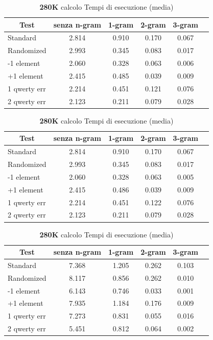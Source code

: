 \documentclass{article}
\begin{document}
\begin{table}[htbp]
\centering 
\caption{\textbf{9K} calcolo Tempi di esecuzione (media)}
\begin{tabular}{l c c c c c}
\hline\hline
\multicolumn{1}{c}{\textbf{Test}}& \textbf{senza n-gram}& \textbf{1-gram} & \textbf{2-gram}& \textbf{3-gram}\\ \hline
Standard    & 2.814 & 0.910 & 0.170 & 0.067\\
Randomized  & 2.993 & 0.345 & 0.083 & 0.017\\
-1 element  & 2.060 & 0.328 & 0.063 & 0.006\\
+1 element  & 2.415 & 0.485 & 0.039 & 0.009\\
1 qwerty err & 2.214 & 0.451 & 0.121 & 0.076\\
2 qwerty err  & 2.123 & 0.211 &  0.079 & 0.028\\
\hline
\end{tabular}

\caption{\textbf{60K} calcolo Tempi di esecuzione (media)}
\begin{tabular}{l c c c c c}
\hline\hline
\multicolumn{1}{c}{\textbf{Test}}& \textbf{senza n-gram}& \textbf{1-gram} & \textbf{2-gram}& \textbf{3-gram}\\ \hline
Standard    & 2.814 & 0.910 & 0.170 & 0.067\\
Randomized  & 2.993 & 0.345 & 0.083 & 0.017\\
-1 element  & 2.060 & 0.328 & 0.063 & 0.005\\
+1 element  & 2.415 & 0.486 & 0.039 & 0.009\\
1 qwerty err & 2.214 & 0.451 & 0.122 & 0.076\\
2 qwerty err & 2.123 & 0.211 & 0.079 & 0.028\\
\hline
\end{tabular}

\caption{\textbf{280K} calcolo Tempi di esecuzione (media)}
\begin{tabular}{l c c c c c}
\hline\hline
\multicolumn{1}{c}{\textbf{Test}}& \textbf{senza n-gram}& \textbf{1-gram} & \textbf{2-gram}& \textbf{3-gram}\\ \hline
Standard    &  7.368 & 1.205 & 0.262 & 0.103\\
Randomized  &  8.117 & 0.856 & 0.262 & 0.010\\
-1 element  &  6.143 & 0.746 & 0.033 & 0.001\\
+1 element  &  7.935 & 1.184 & 0.176 & 0.009\\
1 qwerty err &  7.273 & 0.831 & 0.055 & 0.016\\
2 qwerty err &  5.451 & 0.812 & 0.064 & 0.002\\
\hline
\end{tabular}

\end{table}
\end{document}

